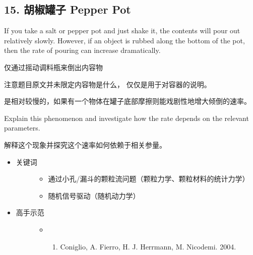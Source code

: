 \documentclass[a4paper,10pt,english]{sphinxmanual}
\begin{document}
\subsection{15. 胡椒罐子 Pepper Pot}
\label{\detokenize{8. Appendix:pepper-pot}}
If you take a salt or pepper pot and just shake it, the contents will pour out relatively slowly. However, if an object is rubbed along the bottom of the pot, then the rate of pouring can increase dramatically.

仅通过摇动调料瓶来倒出内容物 %
\begin{footnote}[12]\sphinxAtStartFootnote
注意题目原文并未限定内容物是什么，  仅仅是用于对容器的说明。
%
\end{footnote} 是相对较慢的，如果有一个物体在罐子底部摩擦则能戏剧性地增大倾倒的速率。

Explain this phenomenon and investigate how the rate depends on the relevant parameters.

解释这个现象并探究这个速率如何依赖于相关参量。
\begin{itemize}
\item {} \begin{description}
\item[{关键词}] \leavevmode\begin{itemize}
\item {} 
通过小孔/漏斗的颗粒流问题（颗粒力学、颗粒材料的统计力学）

\item {} 
随机信号驱动（随机动力学）

\end{itemize}

\end{description}

\item {} \begin{description}
\item[{高手示范}] \leavevmode\begin{itemize}
\item {} \begin{enumerate}
\item {} 
Coniglio, A. Fierro, H. J. Herrmann, M. Nicodemi.  2004.

\end{enumerate}

\end{itemize}

\end{description}

\end{itemize}
\end{document}
